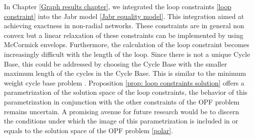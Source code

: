 \documentclass[11pt,a4paper,oneside,openany]{book}
\numberwithin{definition}{section}
\numberwithin{theorem}{section}
\numberwithin{problem}{section}
\begin{document}
\par In Chapter \ref{Graph results chapter}, we integrated the loop constraints \ref{loop constraint} into the Jabr model \eqref{Jabr equality model}. This integration aimed at achieving exactness in non-radial networks. These constraints are in general non convex but a linear relaxation of these constraints can be implemented by using McCormick envelops. Furthermore, the calculation of the loop constraint becomes increasingly difficult with the length of the loop. Since there is not a unique Cycle Base, this could be addressed by choosing the Cycle Base with the smaller maximum length of the cycles in the Cycle Base. This is similar to the minimum weight cycle base problem \cite{CycleBasesInGraphs}.
Proposition \ref{prop: loop constraints solution} offers a parametrization of the solution space of the loop constraints, the behavior of this parametrization in conjunction with the other constraints of the OPF problem remains uncertain. A promising avenue for future research would be to discern the conditions under which the image of this parametrization is included in or equals to the solution space of the OPF problem \ref{polar}.

\end{document}
